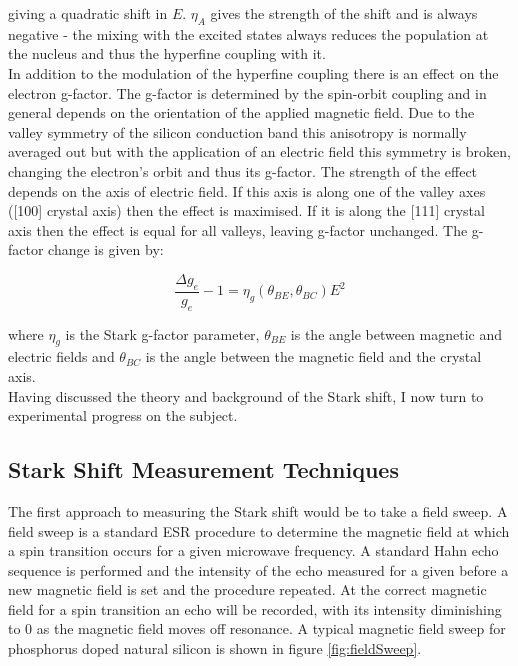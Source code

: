 giving a quadratic shift in $E$. $\eta_A$ gives the strength of the shift and is always negative - the mixing with the excited states always reduces the population at the nucleus and thus the hyperfine coupling with it. 
\\
In addition to the modulation of the hyperfine coupling there is an effect on the electron g-factor.
The g-factor is determined by the spin-orbit coupling and in general depends on the orientation of the applied magnetic field. 
Due to the valley symmetry of the silicon conduction band this anisotropy is normally averaged out but with the application of an electric field this symmetry is broken, changing the electron's orbit and thus its g-factor.
The strength of the effect depends on the axis of electric field. 
If this axis is along one of the valley axes ([100] crystal axis) then the effect is maximised.
If it is along the [111] crystal axis then the effect is equal for all valleys, leaving g-factor unchanged.
The g-factor change is given by:

\begin{equation}
\frac{\Delta g_e}{g_e} - 1 = \eta_g(\theta_{BE}, \theta_{BC})E^2
\end{equation} 

where $\eta_g$ is the Stark g-factor parameter, $\theta_{BE}$ is the angle between magnetic and electric fields and $\theta_{BC}$ is the angle between the magnetic field and the crystal axis.
\\
Having discussed the theory and background of the Stark shift, I now turn to experimental progress on the subject.

\subsection{Stark Shift Measurement Techniques}

The first approach to measuring the Stark shift would be to take a field sweep.
A field sweep is a standard ESR procedure to determine the magnetic field at which a spin transition occurs for a given microwave frequency.
A standard Hahn echo sequence is performed and the intensity of the echo measured for a given before a new magnetic field is set and the procedure repeated.
At the correct magnetic field for a spin transition an echo will be recorded, with its intensity diminishing to 0 as the magnetic field moves off resonance.
A typical magnetic field sweep for phosphorus doped natural silicon is shown in figure \ref{fig:fieldSweep}. 

